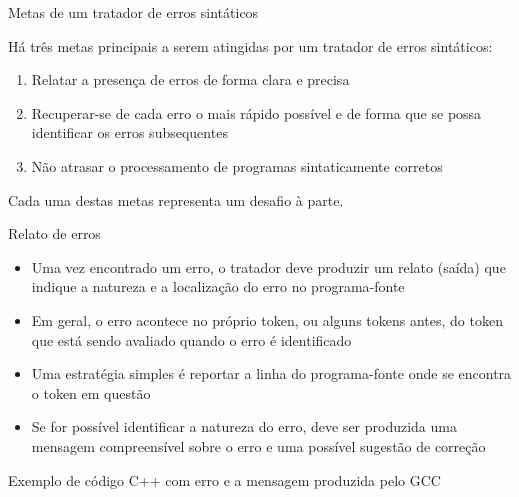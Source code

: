 \begin{frame}[fragile]{Metas de um tratador de erros sintáticos}

    Há três metas principais a serem atingidas por um tratador de erros sintáticos:
    \pause

    \vspace{0.1in}

    \begin{enumerate}
        \item Relatar a presença de erros de forma clara e precisa
        \pause

        \item Recuperar-se de cada erro o mais rápido possível e de forma que se possa identificar os erros subsequentes
        \pause

        \item Não atrasar o processamento de programas sintaticamente corretos
    \end{enumerate}
    \pause

    \vspace{0.1in}
    Cada uma destas metas representa um desafio à parte.
\end{frame}

\begin{frame}[fragile]{Relato de erros}

    \begin{itemize}
        \item Uma vez encontrado um erro, o tratador deve produzir um relato (saída) que indique a natureza e a localização do erro no programa-fonte
        \pause

        \item Em geral, o erro acontece no próprio token, ou alguns tokens antes, do token que está sendo avaliado quando o erro é identificado
        \pause

        \item Uma estratégia simples é reportar a linha do programa-fonte onde se encontra o token em questão
        \pause

        \item Se for possível identificar a natureza do erro, deve ser produzida uma mensagem compreensível sobre o erro e uma possível sugestão de
            correção
    \end{itemize}

\end{frame}

\begin{frame}[fragile]{Exemplo de código C++ com erro e a mensagem produzida pelo GCC}
    \vspace{0.2in}
\end{frame}

